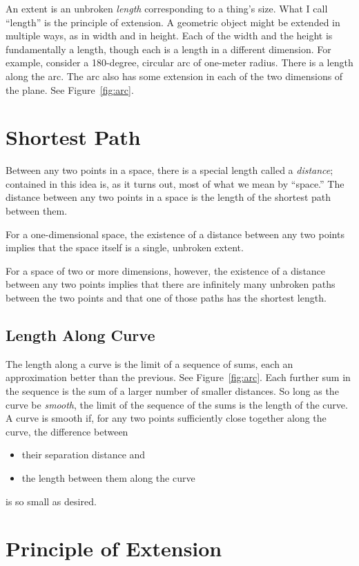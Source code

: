 \documentclass[nobib]{tufte-book}
\begin{document}
An extent is an unbroken \emph{length} corresponding to a thing's size.  What I
call ``length'' is the principle of extension.  A geometric object might be
extended in multiple ways, as in width and in height.  Each of the width and
the height is fundamentally a length, though each is a length in a different
dimension.  For example, consider a 180-degree, circular arc of one-meter
radius.  There is a length along the arc.  The arc also has some extension in
each of the two dimensions of the plane.  See Figure~\ref{fig:arc}.

\section{Shortest Path}

Between any two points in a space, there is a special length called a
\emph{distance}; contained in this idea is, as it turns out, most of what we
mean by ``space.'' The distance between any two points in a space is the length
of the shortest path between them.

For a one-dimensional space, the existence of a distance between any two points
implies that the space itself is a single, unbroken extent.

For a space of two or more dimensions, however, the existence of a distance
between any two points implies that there are infinitely many unbroken paths
between the two points and that one of those paths has the shortest
length.

\subsection{Length Along Curve}

The length along a curve is the limit of a sequence of sums, each an
approximation better than the previous.  See Figure~\ref{fig:arc}.  Each
further sum in the sequence is the sum of a larger number of smaller distances.
So long as the curve be \emph{smooth}, the limit of the sequence of the sums is
the length of the curve.  A curve is smooth if, for any two points sufficiently
close together along the curve, the difference between
\begin{itemize}
   \item their separation distance and
   \item the length between them along the curve
\end{itemize}
is so small as desired.

\section{Principle of Extension}
\end{document}

